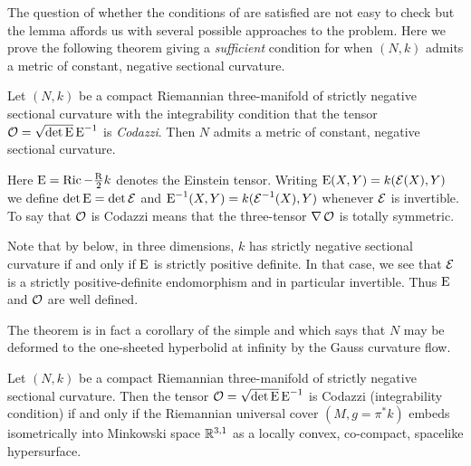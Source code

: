 \documentclass[a4paper, 12pt]{amsart}
\begin{document}
The question of whether the conditions of  are satisfied are not easy to check but the lemma affords us with several possible approaches to the problem. Here we prove the following theorem giving a \emph{sufficient} condition for when \((N, k)\) admits a metric of constant, negative sectional curvature.

\begin{thm}
\label{thm:intg_const_curv}
Let \((N, k)\) be a compact Riemannian three-manifold of strictly negative sectional curvature with the integrability condition that the tensor \(\operatorname{\mathcal{O}} = \sqrt{\det \operatorname{E}} \operatorname{E}^{-1}\) is \emph{Codazzi}. Then \(N\) admits a metric of constant, negative sectional curvature.
\end{thm}

Here \(\operatorname{E} = \operatorname{Ric} - \tfrac{\operatorname{R}}{2}k\) denotes the Einstein tensor. Writing \(\operatorname{E}(X, Y) = k(\operatorname{\mathcal{E}}(X), Y)\) we define \(\det \operatorname{E} = \det \operatorname{\mathcal{E}}\) and \(\operatorname{E}^{-1}(X, Y) = k(\operatorname{\mathcal{E}}^{-1} (X), Y)\) whenever \(\operatorname{\mathcal{E}}\) is invertible. To say that \(\operatorname{\mathcal{O}}\) is Codazzi means that the three-tensor \(\nabla \operatorname{\mathcal{O}}\) is totally symmetric.

\begin{rem}
Note that by  below, in three dimensions, \(k\) has strictly negative sectional curvature if and only if \(\operatorname{E}\) is strictly positive definite. In that case, we see that \(\operatorname{\mathcal{E}}\) is a strictly positive-definite endomorphism and in particular invertible. Thus \(\operatorname{E}\) and \(\operatorname{\mathcal{O}}\) are well defined.
\end{rem}

The theorem is in fact a corollary of the simple  and \cite[Theorem 1.1]{MR3344442} which says that \(N\) may be deformed to the one-sheeted hyperbolid at infinity by the Gauss curvature flow.

\begin{thm}
\label{thm:intg_embed}
Let \((N, k)\) be a compact Riemannian three-manifold of strictly negative sectional curvature. Then the tensor \(\operatorname{\mathcal{O}} = \sqrt{\det \operatorname{E}} \operatorname{E}^{-1}\) is Codazzi (integrability condition) if and only if the Riemannian universal cover \((M, g = \pi^{\ast} k)\) embeds isometrically into Minkowski space \(\mathbb{R}^{3,1}\) as a locally convex, co-compact, spacelike hypersurface.
\end{thm}
\end{document}
